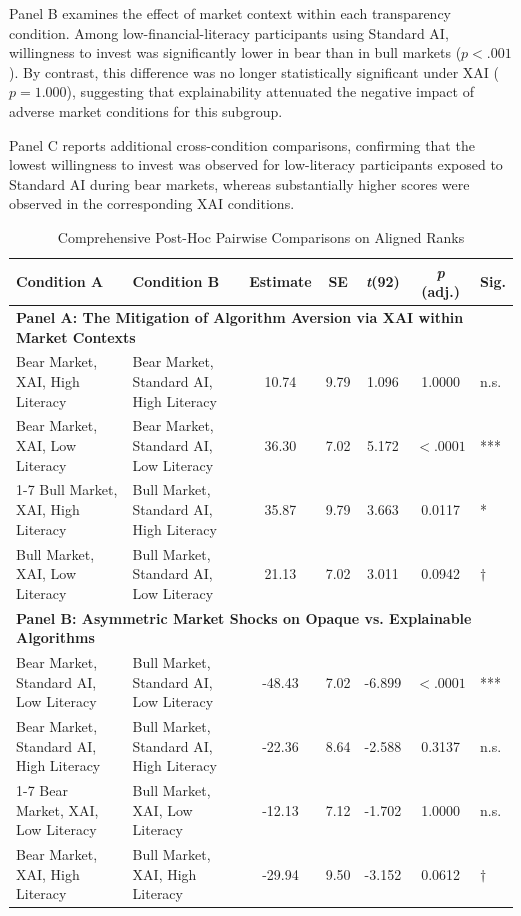 \documentclass[10pt, a4paper]{article} %
\begin{document}
Panel B examines the effect of market context within each transparency condition. Among low-financial-literacy participants using Standard AI, willingness to invest was significantly lower in bear than in bull markets ($p<.001$). By contrast, this difference was no longer statistically significant under XAI ($p=1.000$), suggesting that explainability attenuated the negative impact of adverse market conditions for this subgroup.

Panel C reports additional cross-condition comparisons, confirming that the lowest willingness to invest was observed for low-literacy participants exposed to Standard AI during bear markets, whereas substantially higher scores were observed in the corresponding XAI conditions.

\clearpage

\begin{table}
\centering
\caption{Comprehensive Post-Hoc Pairwise Comparisons on Aligned Ranks}
\label{tab:artcon_full}
\begin{threeparttable}
\small
{}\selectfont %
\setlength{\tabcolsep}{18pt}   %
\renewcommand{\arraystretch}{1.3} %

\begin{tabular}{llccccl}
\toprule
\textbf{Condition A} & \textbf{Condition B} & \textbf{Estimate} & \textbf{SE} & \textbf{\textit{t}(92)} & \textbf{\textit{p} (adj.)} & \textbf{Sig.} \\
\midrule

\multicolumn{7}{l}{\textbf{Panel A: The Mitigation of Algorithm Aversion via XAI within Market Contexts}} \\
Bear Market, XAI, High Literacy & Bear Market, Standard AI, High Literacy & 10.74 & 9.79 & 1.096 & 1.0000 & n.s. \\
Bear Market, XAI, Low Literacy  & Bear Market, Standard AI, Low Literacy  & 36.30 & 7.02 & 5.172 & $<.0001$ & *** \\
\cmidrule{1-7}
Bull Market, XAI, High Literacy & Bull Market, Standard AI, High Literacy & 35.87 & 9.79 & 3.663 & 0.0117 & * \\
Bull Market, XAI, Low Literacy  & Bull Market, Standard AI, Low Literacy  & 21.13 & 7.02 & 3.011 & 0.0942 & $\dagger$ \\

\midrule
\multicolumn{7}{l}{\textbf{Panel B: Asymmetric Market Shocks on Opaque vs. Explainable Algorithms}} \\
Bear Market, Standard AI, Low Literacy  & Bull Market, Standard AI, Low Literacy  & -48.43 & 7.02 & -6.899 & $<.0001$ & *** \\
Bear Market, Standard AI, High Literacy & Bull Market, Standard AI, High Literacy & -22.36 & 8.64 & -2.588 & 0.3137 & n.s. \\
\cmidrule{1-7}
Bear Market, XAI, Low Literacy  & Bull Market, XAI, Low Literacy  & -12.13 & 7.12 & -1.702 & 1.0000 & n.s. \\
Bear Market, XAI, High Literacy & Bull Market, XAI, High Literacy & -29.94 & 9.50 & -3.152 & 0.0612 & $\dagger$ \\


\end{tabular}
\end{threeparttable}
\end{table}
\end{document}
